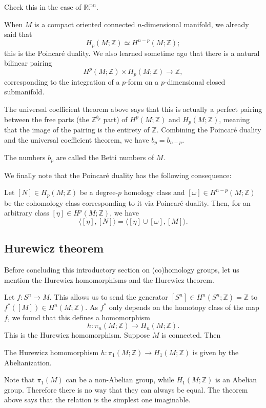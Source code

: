 \documentclass[12pt]{article}
\numberwithin{equation}{section}
\numberwithin{figure}{section}
\theoremstyle{remark}
\def\bZ{\mathbb{Z}}
\def\RP{\mathbb{RP}}
\begin{document}
\begin{question}
Check this in the case of $\RP^n$.
\end{question}

When $M$ is a compact oriented connected $n$-dimensional manifold,
we already said that 
\begin{equation}
  H_p(M;\bZ)\simeq H^{n-p}(M;\bZ); \label{eq:pd}
\end{equation}
this is the Poincar\'e duality.
We also learned sometime ago that there is a natural bilinear pairing 
\begin{equation}
H^p(M;\bZ)\times H_p(M;\bZ) \to \bZ,
\end{equation}
corresponding to the integration of a $p$-form on a $p$-dimensional closed submanifold.

The universal coefficient theorem above says that
this is actually a perfect pairing between the free parts (the $\bZ^{b_p}$ part) of $H^p(M;\bZ)$ and $H_p(M;\bZ)$,
meaning that the image of the pairing is the entirety of $\bZ$.
Combining the Poincar\'e duality and the universal coefficient theorem,
we have $b_p=b_{n-p}$.
\begin{definition}
  The numbers $b_p$ are called the Betti numbers of $M$.
\end{definition}

We finally note that the Poincar\'e duality has the following consequence:
\begin{proposition}
  Let $[N]\in H_p(M;\bZ)$ 
  be a degree-$p$ homology class and $[\omega]\in H^{n-p}(M;\bZ)$ 
  be the cohomology class corresponding to it via Poincar\'e duality.
  Then, for an arbitrary class $[\eta]\in H^p(M;\bZ)$,
  we have \begin{equation}
    \langle [\eta],[N]\rangle = \langle [\eta]\cup [\omega],[M]\rangle.
  \end{equation}  
\end{proposition}

\subsection{Hurewicz theorem}

Before concluding this introductory section on (co)homology groups,
let us mention the Hurewicz homomorphisms and the Hurewicz theorem.

Let $f:S^n\to M$. This allows us to send the generator $[S^n] \in H^n(S^n;\bZ)=\bZ$ to $f^*([M])\in H^n(M;\bZ)$.
As $f^*$ only depends on the homotopy class of the map $f$, 
we found that this defines a homomorphism \begin{equation}
  h:\pi_n(M;\bZ)\to H_n(M;\bZ).
\end{equation}
This is the Hurewicz homomorphism.
Suppose $M$ is connected. Then 
\begin{theorem}
  The Hurewicz homomorphism $h:\pi_1(M;\bZ)\to H_1(M;\bZ)$ is given by the Abelianization.
\end{theorem}
Note that $\pi_1(M)$ can be a non-Abelian group,
while $H_1(M;\bZ)$ is an Abelian group.
Therefore there is no way that they can always be equal.
The theorem above says that the relation is the simplest one imaginable.
\end{document}
